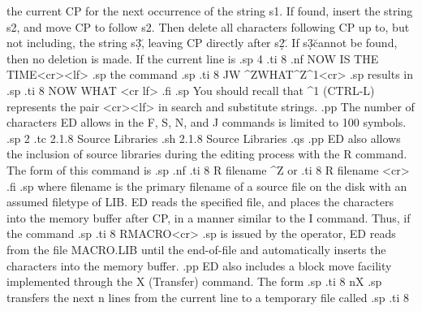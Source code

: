 the current CP for the next occurrence of the string s1.  If found,
insert the string s2, and move CP to follow s2.  Then delete all
characters following CP up to, but not including, the string s\d3\u, leaving
CP directly after s\d2\u.  If s\d3\u cannot be found, then no deletion is
made.  If the current line is
.sp 4
.ti 8
.nf
NOW IS THE TIME<cr><lf>
.sp
the command
.sp
.ti 8
JW ^ZWHAT^Z^1<cr>
.sp
results in
.sp
.ti 8
NOW WHAT <cr lf>
.fi
.sp
You should recall that ^1 (CTRL-L) represents the pair 
<cr><lf> in search and substitute strings.
.pp
The number of characters ED allows in the F, S, N, and J 
commands is limited to 100 symbols.
.sp 2
.tc         2.1.8  Source Libraries
.sh
2.1.8  Source Libraries
.qs
.pp
ED also allows the inclusion of source libraries during the 
editing process with the R command.  The form of this command is
.sp
.nf
.ti 8
R filename ^Z
or
.ti 8
R filename <cr>
.fi
.sp
where filename is the primary filename of a source file on the 
disk with an assumed filetype of LIB.  ED reads the specified 
file, and places the characters into the memory buffer after CP, 
in a manner similar to the I command.  Thus, if the command
.sp
.ti 8
RMACRO<cr>
.sp
is issued by the operator, ED reads from the file MACRO.LIB until 
the end-of-file and automatically inserts the characters into the 
memory buffer.
.pp
ED also includes a block move facility implemented through the 
X (Transfer) command.  The form
.sp
.ti 8
nX
.sp
transfers the next n lines from the current line to a temporary 
file called
.sp
.ti 8

